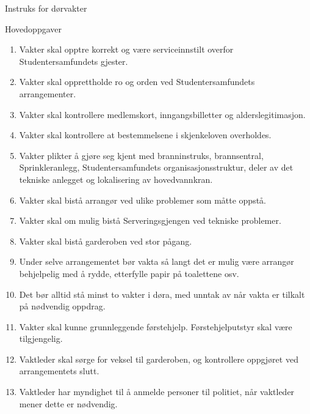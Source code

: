 \begin{instruks*}{Instruks for dørvakter}
    \begin{instruksledd}{Hovedoppgaver}
        \begin{enumerate}
            \item Vakter skal opptre korrekt og være serviceinnstilt overfor Studentersamfundets gjester.
            \item Vakter skal opprettholde ro og orden ved Studentersamfundets arrangementer.
            \item Vakter skal kontrollere medlemskort, inngangsbilletter og alderslegitimasjon.
            \item Vakter skal kontrollere at bestemmelsene i skjenkeloven overholdes.
            \item Vakter plikter å gjøre seg kjent med branninstruks, brannsentral, Sprinkleranlegg, Studentersamfundets
                organisasjonsstruktur, deler av det tekniske anlegget og lokalisering av hovedvannkran.
            \item Vakter skal bistå arrangør ved ulike problemer som måtte oppstå.
            \item Vakter skal om mulig bistå Serveringsgjengen ved tekniske problemer.
            \item Vakter skal bistå garderoben ved stor pågang.
            \item Under selve arrangementet bør vakta så langt det er mulig være arrangør behjelpelig med å rydde, etterfylle
                papir på toalettene osv.
            \item Det bør alltid stå minst to vakter i døra, med unntak av når vakta er tilkalt på nødvendig oppdrag.
            \item Vakter skal kunne grunnleggende førstehjelp. Førstehjelputstyr skal være tilgjengelig.
            \item Vaktleder skal sørge for veksel til garderoben, og kontrollere oppgjøret ved arrangementets slutt. 
            \item Vaktleder har myndighet til å anmelde personer til politiet, når vaktleder mener dette er nødvendig.
        \end{enumerate}
    \end{instruksledd}


\end{instruks*}
